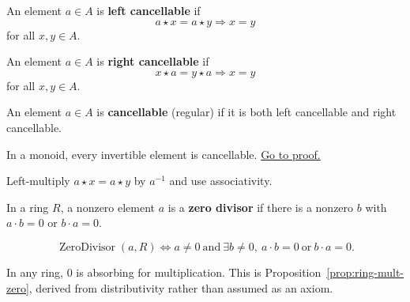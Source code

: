 \begin{definition}
\label{def:left-cancellable}
An element $a\in A$ is \textbf{left cancellable} if
\[
a\star x=a\star y\Longrightarrow x=y
\]
for all $x,y\in A$.
\end{definition}

\begin{definition}
\label{def:right-cancellable}
An element $a\in A$ is \textbf{right cancellable} if
\[
x\star a=y\star a\Longrightarrow x=y
\]
for all $x,y\in A$.
\end{definition}

\begin{definition}
\label{def:cancellable}
An element $a\in A$ is \textbf{cancellable} (regular) if it is both left
cancellable and right cancellable.
\end{definition}

\begin{proposition}
\label{prop:invertible-implies-cancellable}
In a monoid, every invertible element is cancellable.
\hyperref[prf:invertible-implies-cancellable]{Go to proof.}
\end{proposition}

\begin{remark*}
Left-multiply $a\star x=a\star y$ by $a^{-1}$ and use associativity.
\end{remark*}

\begin{definition}
\label{def:zero-divisor}
In a ring $R$, a nonzero element $a$ is a \textbf{zero divisor} if there is
a nonzero $b$ with $a\cdot b=0$ or $b\cdot a=0$.
\end{definition}

\begin{remark*}
\[
\operatorname{ZeroDivisor}(a,R)\Longleftrightarrow
a\neq 0\ \text{and}\ \exists b\neq 0,\ a\cdot b=0\ \text{or}\ b\cdot a=0.
\]
\end{remark*}

\begin{remark*}
In any ring, $0$ is absorbing for multiplication. This is
Proposition~\ref{prop:ring-mult-zero}, derived from distributivity rather
than assumed as an axiom.
\end{remark*}
